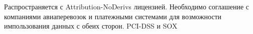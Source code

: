 Распространяется с Attribution-NoDerivs лицензией.
Необходимо соглашение с компаниями авиаперевозок и платежными системами
для возможности импользования данных с обеих сторон.
PCI-DSS и SOX
